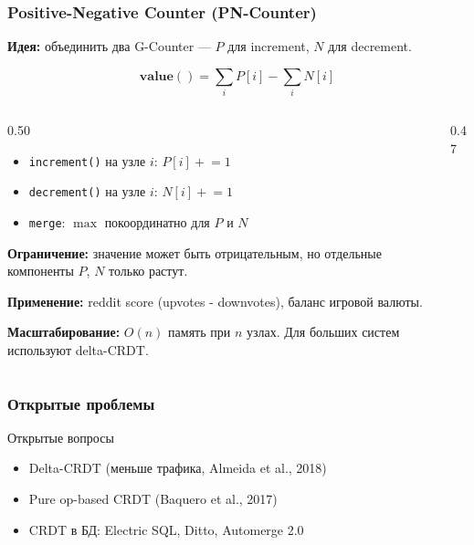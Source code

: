 \documentclass{beamer}
\begin{document}
\begin{frame}
\frametitle{Positive-Negative Counter (PN-Counter)}

\textbf{Идея:} объединить два G-Counter — $P$ для increment, $N$ для decrement.

\[
  \textbf{value}() = \sum_i P[i] - \sum_i N[i]
\]

\begin{columns}
\begin{column}{0.50\textwidth}
\begin{itemize}
  \item \texttt{increment()} на узле $i$: $P[i] \mathrel{+}= 1$
  \item \texttt{decrement()} на узле $i$: $N[i] \mathrel{+}= 1$
  \item \texttt{merge}: $\max$ покоординатно для $P$ и $N$
\end{itemize}

\medskip
\textbf{Ограничение:} значение может быть отрицательным, но отдельные компоненты $P$, $N$ только растут.

\medskip
\textbf{Применение:} reddit score (upvotes - downvotes), баланс игровой валюты.

\medskip
\textbf{Масштабирование:} $O(n)$ память при $n$ узлах. Для больших систем используют delta-CRDT.
\end{column}
\begin{column}{0.47\textwidth}
\end{column}
\end{columns}

\end{frame}


\begin{frame}
\frametitle{Открытые проблемы}

\begin{exampleblock}{Открытые вопросы}
\small
\begin{itemize}
  \item Delta-CRDT (меньше трафика, Almeida et al., 2018)
  \item Pure op-based CRDT (Baquero et al., 2017)
  \item CRDT в БД: Electric SQL, Ditto, Automerge 2.0
\end{itemize}
\end{exampleblock}

\end{frame}
\end{document}
